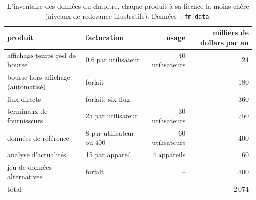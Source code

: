 \begin{table}[ht]
\centering\small\setlength{\tabcolsep}{4pt}
\begin{tabular}{llrr}
\toprule
produit & facturation & usage & milliers de dollars par an \\
\midrule
affichage temps réel de bourse & 0.6 par utilisateur & 40 utilisateurs & 24 \\
bourse hors affichage (automatisé) & forfait & -- & 180 \\
flux directs & forfait, six flux & -- & 360 \\
terminaux de fournisseurs & 25 par utilisateur & 30 utilisateurs & 750 \\
données de référence & 8 par utilisateur ou 400 & 60 utilisateurs & 400 \\
analyse d'actualités & 15 par appareil & 4 appareils & 60 \\
jeu de données alternatives & forfait & -- & 300 \\
\midrule
total & & & 2\,074 \\
\bottomrule
\end{tabular}
\caption{L'inventaire des données du chapitre, chaque produit à sa licence la moins chère (niveaux de redevance illustratifs). Données~: \texttt{fm\_data}.}\label{tab:fm:data-strategy-and-costs:inventory}
\end{table}

\begin{omfigure}

\label{fig:fm:data-strategy-and-costs:budget}
\end{omfigure}

